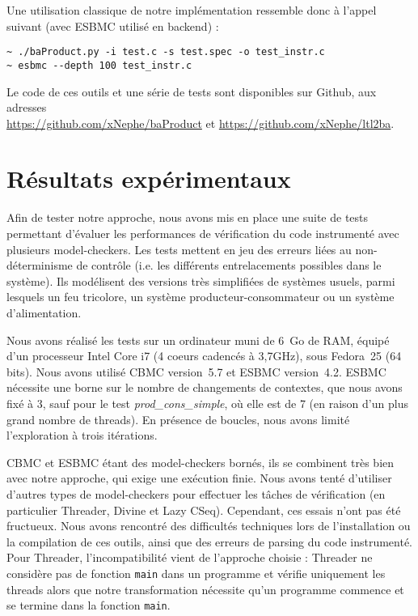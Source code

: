 Une utilisation classique de notre implémentation ressemble donc à
l'appel suivant (avec ESBMC\cite{ESBMC} utilisé en backend) :

\begin{lstlisting}
~ ./baProduct.py -i test.c -s test.spec -o test_instr.c
~ esbmc --depth 100 test_instr.c
\end{lstlisting}

Le code de ces outils et une série de tests sont disponibles sur Github, aux
adresses\\
\href{https://github.com/xNephe/baProduct}{https://github.com/xNephe/baProduct}
et
\href{https://github.com/xNephe/ltl2ba}{https://github.com/xNephe/ltl2ba}.
\section{Résultats expérimentaux}

Afin de tester notre approche, nous avons mis en place une suite de tests
permettant d'évaluer les performances de vérification du code instrumenté avec
plusieurs model-checkers. Les tests mettent en jeu des erreurs liées au
non-déterminisme de contrôle (i.e. les différents entrelacements possibles dans
le système). Ils modélisent des versions très simplifiées de systèmes usuels,
parmi lesquels un feu tricolore, un système producteur-consommateur ou un
système d'alimentation.

Nous avons réalisé les tests sur un ordinateur muni de 6~Go de RAM, équipé d'un
processeur Intel Core i7 (4 coeurs cadencés à 3,7GHz), sous Fedora~25 (64 bits).
Nous avons utilisé CBMC\cite{CBMC} version~5.7 et ESBMC\cite{ESBMC} version~4.2.
ESBMC nécessite une borne sur le nombre de changements de contextes, que nous
avons fixé à 3, sauf pour le test \emph{prod\_cons\_simple}, où elle est de 7
(en raison d'un plus grand nombre de threads). En présence de boucles, nous
avons limité l'exploration à trois itérations.

CBMC et ESBMC étant des model-checkers bornés, ils se combinent très bien avec
notre approche, qui exige une exécution finie. Nous avons tenté d'utiliser
d'autres types de model-checkers pour effectuer les tâches de vérification (en
particulier Threader, Divine et Lazy CSeq). Cependant, ces essais n'ont pas été
fructueux. Nous avons rencontré des difficultés techniques lors de
l'installation ou la compilation de ces outils, ainsi que des erreurs de parsing
du code instrumenté. Pour Threader, l'incompatibilité vient de l'approche
choisie : Threader ne considère pas de fonction \texttt{main} dans un programme
et vérifie uniquement les threads alors que notre transformation nécessite qu'un
programme commence et se termine dans la fonction \texttt{main}.

